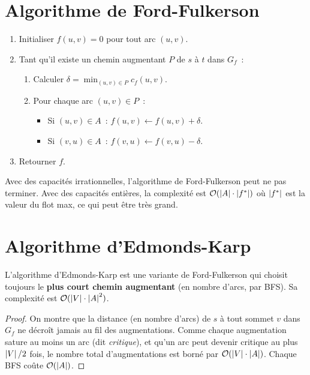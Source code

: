 \section{Algorithme de Ford-Fulkerson}

\begin{algorithme}[title=\textbf{Ford-Fulkerson}]
\begin{enumerate}
  \item Initialiser $f(u,v) = 0$ pour tout arc $(u,v)$.
  \item Tant qu'il existe un chemin augmentant $P$ de $s$ \`a $t$ dans $G_f$~:
    \begin{enumerate}
      \item Calculer $\delta = \min_{(u,v) \in P} c_f(u,v)$.
      \item Pour chaque arc $(u,v) \in P$~:
        \begin{itemize}
          \item Si $(u,v) \in A$~: $f(u,v) \leftarrow f(u,v) + \delta$.
          \item Si $(v,u) \in A$~: $f(v,u) \leftarrow f(v,u) - \delta$.
        \end{itemize}
    \end{enumerate}
  \item Retourner $f$.
\end{enumerate}
\end{algorithme}

\begin{attention}[title=\textbf{Terminaison de Ford-Fulkerson}]
Avec des capacit\'es irrationnelles, l'algorithme de Ford-Fulkerson peut ne pas
terminer. Avec des capacit\'es enti\`eres, la complexit\'e est
$\mathcal{O}(\left| A \right| \cdot \left| f^* \right|)$ o\`u $\left| f^* \right|$ est la valeur du flot
max, ce qui peut \^etre tr\`es grand.
\end{attention}

\section{Algorithme d'Edmonds-Karp}

\begin{theoreme}
L'algorithme d'Edmonds-Karp est une variante de Ford-Fulkerson qui choisit
toujours le \textbf{plus court chemin augmentant} (en nombre d'arcs, par BFS).
Sa complexit\'e est $\mathcal{O}(\left| V \right| \cdot \left| A \right|^2)$.
\end{theoreme}

\begin{proof}
On montre que la distance (en nombre d'arcs) de $s$ \`a tout sommet $v$ dans
$G_f$ ne d\'ecro\^it jamais au fil des augmentations. Comme chaque augmentation
sature au moins un arc (dit \emph{critique}), et qu'un arc peut devenir
critique au plus $\left| V \right|/2$ fois, le nombre total d'augmentations est born\'e
par $\mathcal{O}(\left| V \right| \cdot \left| A \right|)$. Chaque BFS co\^ute
$\mathcal{O}(\left| A \right|)$.
\end{proof}

